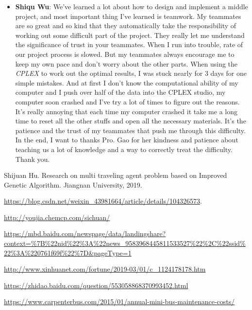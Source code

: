 \documentclass{llncs}
\begin{document}
\begin{itemize}
	\item \textbf{Shiqu Wu}: We've learned a lot about how to design and implement a middle project, and most important thing I've learned is teamwork.  My teammates are so great and so kind that they automatically  take the responsibility of  working out some difficult part of the project. They really let me understand the significance of trust in your teammates.  When I run into trouble,  rate of our project process is slowed.  But my teammates always encourage me to keep my own pace and don't worry about the other parts.  When using the \emph{CPLEX} to work out the optimal results,   I was stuck nearly for $3$ days for one simple mistakes.  And at first I don't know the computational ability of my computer and I push over half of the data into the CPLEX studio,  my computer soon crashed and I've try a lot of times to figure out the reasons.  It's really annoying that each time my computer crashed it take me a long time to reset all the other stuffs and open all the necessary materials.  It's the patience and the trust of my teammates that  push me through this difficulty.  In the end,  I want to thanks Pro. Gao for her kindness and patience about teaching us a lot of knowledge and a way to correctly treat the difficulty.  Thank you. 
\end{itemize}


%
%
%
% 
% 
%
\begin{thebibliography}{8}
Shijuan Hu. Research on multi traveling agent problem based on Improved Genetic Algorithm. Jiangnan University, 2019.

\url{https://blog.csdn.net/weixin_43981664/article/details/104326573}.

\url{http://youjia.chemcp.com/sichuan/}

\url{https://mbd.baidu.com/newspage/data/landingshare?context=%7B%22nid%22%3A%22news_9583968445811533527%22%2C%22ssid%22%3A%220761f69f%22%7D&pageType=1}
	
\url{http://www.xinhuanet.com/fortune/2019-03/01/c_1124178178.htm}

\url{https://zhidao.baidu.com/question/553058868370993452.html}

\url{https://www.carpenterbus.com/2015/01/annual-mini-bus-maintenance-costs/}




\end{thebibliography}
\end{document}
